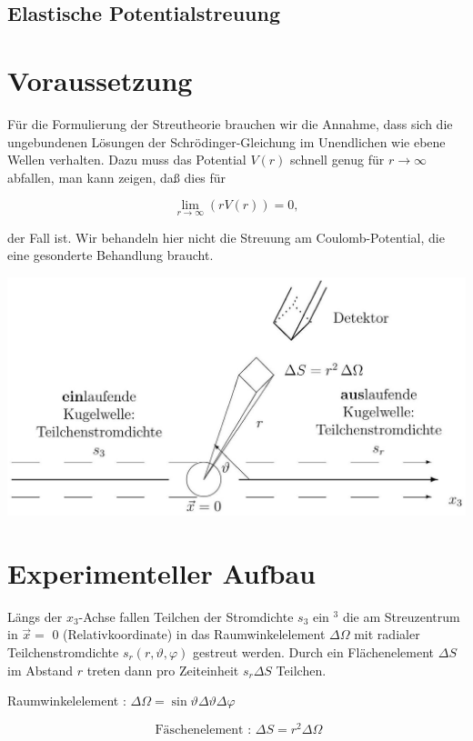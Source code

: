 \documentclass[10pt, letterpaper]{article}
\begin{document}
\subsection*{Elastische Potentialstreuung}
\section*{Voraussetzung}
Für die Formulierung der Streutheorie brauchen wir die Annahme, dass sich die ungebundenen Lösungen der Schrödinger-Gleichung im Unendlichen wie ebene Wellen verhalten. Dazu muss das Potential $V(r)$ schnell genug für $r \rightarrow \infty$ abfallen, man kann zeigen, daß dies für

$$
\lim _{r \rightarrow \infty}(r V(r))=0,
$$

der Fall ist. Wir behandeln hier nicht die Streuung am Coulomb-Potential, die eine gesonderte Behandlung braucht.

\includegraphics[scale=0.2, center]{2025_05_21_d5590f158a899e385c7cg-13}

\section*{Experimenteller Aufbau}
Längs der $x_{3}$-Achse fallen Teilchen der Stromdichte $s_{3}$ ein ${ }^{3}$ die am Streuzentrum in $\vec{x}=$ 0 (Relativkoordinate) in das Raumwinkelelement $\Delta \Omega$ mit radialer Teilchenstromdichte $s_{r}(r, \vartheta, \varphi)$ gestreut werden. Durch ein Flächenelement $\Delta S$ im Abstand $r$ treten dann pro Zeiteinheit $s_{r} \Delta S$ Teilchen.

Raumwinkelelement : $\Delta \Omega=\sin \vartheta \Delta \vartheta \Delta \varphi$

$$
\text { Fäschenelement : } \Delta S=r^{2} \Delta \Omega
$$
\end{document}
